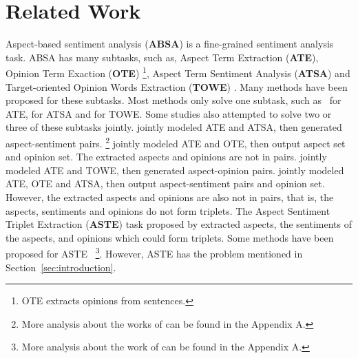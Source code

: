 \documentclass[11pt]{article}
\begin{document}
\section{Related Work}
Aspect-based sentiment analysis (\textbf{ABSA}) \citep{10.1145/1014052.1014073, pontiki-etal-2014-semeval, pontiki-etal-2015-semeval, pontiki-etal-2016-semeval} is a fine-grained sentiment analysis task. ABSA has many subtasks, such as, Aspect Term Extraction (\textbf{ATE}), Opinion Term Exaction (\textbf{OTE}) \footnote{OTE extracts opinions from sentences.}, Aspect Term Sentiment Analysis (\textbf{ATSA}) and Target-oriented Opinion Words Extraction (\textbf{TOWE}) \citep{fan2019target}. Many methods have been proposed for these subtasks. Most methods only solve one subtask, such as~\citet{qiu2011opinion, yin2016unsupervised, li2018aspect, xu2018double, wei2020don,li-etal-2020-conditional} for ATE, \citet{dong2014adaptive, nguyen-shirai-2015-phrasernn,tang-etal-2016-effective, ma2017interactive, xue-li-2018-aspect, jiang-etal-2019-challenge, tang2020dependency, wang2020relational, zhao2020modeling,dai2021does} for ATSA and \citet{fan2019target, wu2020latent,pouran-ben-veyseh-etal-2020-introducing,jiang-etal-2021-attention} for TOWE. Some studies also attempted to solve two or three of these subtasks jointly.  \citet{zhou2019span, li2019unified, phan2020modelling} jointly modeled ATE and ATSA, then generated aspect-sentiment pairs. \citet{wang2016recursive, wang2017coupled, dai2019neural}\footnote{More analysis about the works of \citet{wang2016recursive,wang2017coupled}  can be found in the Appendix A.} jointly modeled ATE and OTE, then output aspect set and opinion set. The extracted
aspects and opinions are not in pairs. \citet{zhao2020spanmlt, chen2020synchronous} jointly modeled ATE and TOWE, then generated aspect-opinion pairs.  \citet{he2019interactive, chen2020relation} jointly modeled ATE, OTE and ATSA, then output aspect-sentiment pairs and opinion  set. However, the extracted
aspects and opinions are also not in pairs, that is, the aspects, sentiments and opinions do not form triplets. The Aspect Sentiment Triplet Extraction (\textbf{ASTE}) task proposed by \citet{Peng2020KnowingWH} extracted aspects, the sentiments of the aspects, and opinions which could form triplets. Some methods have been proposed for ASTE~\citep{xu-etal-2020-position, 10.1007/978-3-030-61609-0_52, 10.1007/978-3-030-60450-9_52, wu-etal-2020-grid,zhang-etal-2020-multi-task,mao2021joint,chen2021bidirectional}  \footnote{More analysis about the work of \citet{zhang-etal-2020-multi-task}  can be found in the Appendix A.}. However, ASTE has the problem mentioned in Section~\ref{sec:introduction}. 
\end{document}
